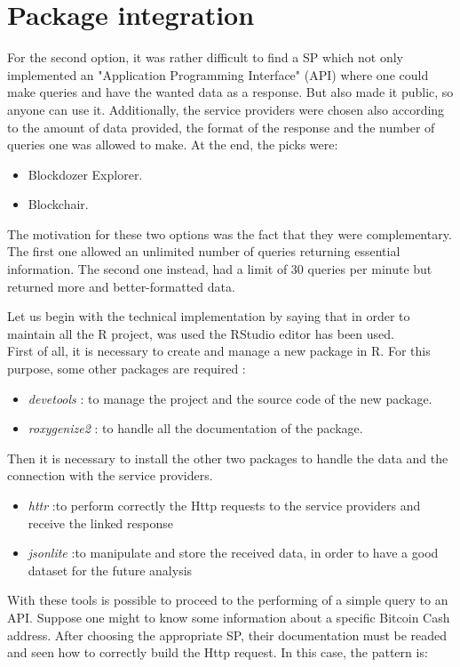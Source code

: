 \section{Package integration}
\label{sec:integration}

For the second option, it was rather difficult to find a SP which 
not only implemented an "Application Programming Interface" (API)\cite{api} where one could
make queries and have the wanted data as a response. But also made it public, 
so anyone can use it. Additionally, the service providers were chosen also 
according to the amount of data provided, the format of the response and the 
number of queries one was allowed to make. At the end, the picks were:
\begin{itemize}
    \item Blockdozer Explorer.
    \item Blockchair.
\end{itemize} 
The motivation for these two options was the fact that they were complementary.
The first one allowed an unlimited number of queries returning essential information.
The second one instead, had a limit of 30 queries per minute but returned more 
and better-formatted data. 

Let us begin with the technical implementation by saying that in order to maintain all the R project, 
was used the RStudio editor\cite{rstudio} has been used.\\ 
First of all, it is necessary to create and manage a new package in R. For this 
purpose, some other packages are required : 
\begin{itemize}
    \item \textit{devetools}   : to manage the project and the source code of the new package.
    \item \textit{roxygenize2} : to handle all the documentation of the package.
\end{itemize}
Then it is necessary to install the other two packages to handle the data and the connection with 
the service providers.
\begin{itemize}
    \item \textit{httr}        :to perform correctly the Http requests to the service providers and receive the linked response
    \item \textit{jsonlite}    :to manipulate and store the received data, in order to have a good dataset for the future analysis
\end{itemize}
With these tools is possible to proceed to the performing of a simple query to an API. Suppose one might to know
some information about a specific Bitcoin Cash address. After choosing the appropriate SP,
their documentation must be readed and seen how to correctly build the Http request. 
In this case, the pattern is: \medskip


